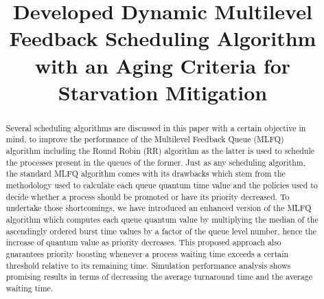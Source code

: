 \documentclass[conference]{IEEEtran}
\begin{document}

\title{Developed Dynamic Multilevel Feedback Scheduling Algorithm with an Aging Criteria for Starvation Mitigation\\}


\author{
}


\maketitle


\begin{abstract}
    Several scheduling algorithms are discussed in this paper with a certain objective in mind, to improve the performance of the Multilevel Feedback Queue (MLFQ) algorithm including the Round Robin (RR) algorithm as the latter is used to schedule the processes present in the queues of the former. Just as any scheduling algorithm, the standard MLFQ algorithm comes with its drawbacks which stem from the methodology used to calculate each queue quantum time value and the policies used to decide whether a process should be promoted or have its priority decreased. To undertake those shortcomings, we have introduced an enhanced version of the MLFQ algorithm which computes each queue quantum value by multiplying the median of the ascendingly ordered burst time values by a factor of the queue level number, hence the increase of quantum value as priority decreases. This proposed approach also guarantees priority boosting whenever a process waiting time exceeds a certain threshold relative to its remaining time. Simulation performance analysis shows promising results in terms of decreasing the average turnaround time and the average waiting time.
\end{abstract}
\end{document}
